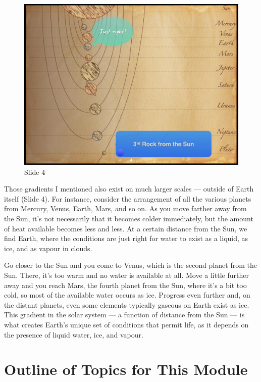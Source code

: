 \documentclass[
  10pt,
]{book}
\begin{document}
\begin{figure}[ht]
\centering
\includegraphics[width=0.8\linewidth]{../images/BDC334/BDC334-004.jpeg}
\caption*{Slide 4}
\end{figure}

Those gradients I mentioned also exist on much larger scales --- outside
of Earth itself (Slide 4). For instance, consider the arrangement of all
the various planets from Mercury, Venus, Earth, Mars, and so on. As you
move farther away from the Sun, it's not necessarily that it becomes
colder immediately, but the amount of heat available becomes less and
less. At a certain distance from the Sun, we find Earth, where the
conditions are just right for water to exist as a liquid, as ice, and as
vapour in clouds.

Go closer to the Sun and you come to Venus, which is the second planet
from the Sun. There, it's too warm and no water is available at all.
Move a little further away and you reach Mars, the fourth planet from
the Sun, where it's a bit too cold, so most of the available water
occurs as ice. Progress even further and, on the distant planets, even
some elements typically gaseous on Earth exist as ice. This gradient in
the solar system --- a function of distance from the Sun --- is what
creates Earth's unique set of conditions that permit life, as it depends
on the presence of liquid water, ice, and vapour.

\section{Outline of Topics for This
Module}\label{outline-of-topics-for-this-module}
\end{document}
